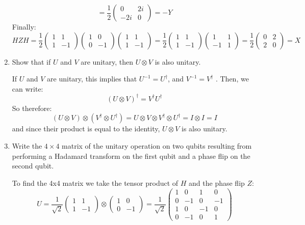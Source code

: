 \documentclass[10pt]{article}
\begin{document}
\begin{enumerate}[label=\alph*)]
\begin{solution}
\[					= \frac{1}{2}\begin{pmatrix} 0 & 2i\\-2i & 0 \end{pmatrix} = -Y
				\] 
				Finally:
				\[
				HZH =  	\frac{1}{2}\begin{pmatrix} 1 & 1 \\ 1 & -1 \end{pmatrix} 
				\begin{pmatrix} 1 & 0\\ 0 & -1 \end{pmatrix} 
					\begin{pmatrix} 1 & 1 \\ 1 & -1 \end{pmatrix}  
					= \frac{1}{2}\begin{pmatrix}1 & 1\\1&-1\end{pmatrix} 
					\begin{pmatrix} 1 & 1 \\ -1 & 1 \end{pmatrix} 
					= \frac{1}{2} \begin{pmatrix} 0 & 2 \\ 2 & 0 \end{pmatrix} = X
				\] 
			\end{solution}
		\item Show that if \( U \) and \( V \) are unitary, then \( U \otimes V \) is also unitary. 

			\begin{solution}
				If \( U \) and \( V \) are unitary, this implies that \( U^{-1} = U^{\dagger} \), and 
				\( V^{-1} = V^{\dagger}\) . Then, we can write:
				\[
					(U \otimes V)^{\dagger} = V^{\dagger} U^{\dagger}
				\] 
				So therefore:
				\[
					(U \otimes V)\otimes (V^{\dagger} \otimes U^{\dagger}) = 
					U \otimes V \otimes V^{\dagger} \otimes U^{\dagger} = I \otimes I = I
				\] 
				and since their product is equal to the identity, \( U \otimes V \) is also unitary. 
			\end{solution}
		\item Write the \( 4 \times 4 \) matrix of the unitary operation on two qubits resulting from 
			performing a Hadamard transform on the first qubit and a phase flip on the second qubit. 

			\begin{solution}
				To find the 4x4 matrix we take the tensor product of \( H \) and the phase flip 
				\( Z \):
				\[
				U = \frac{1}{\sqrt{2} }\begin{pmatrix} 1 &1\\1&-1\end{pmatrix}  \otimes 
				\begin{pmatrix} 1&0\\0&-1 \end{pmatrix} 
				= \frac{1}{\sqrt{2} }\begin{pmatrix} 1&0&1&0\\0&-1&0&-1\\1&0&-1&0\\
				0&-1&0&1\end{pmatrix} 
				\] 
			\end{solution}
	\end{enumerate}
\end{document}

